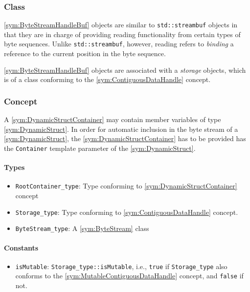 \subsubsection[Class ByteStreamHandleBuf]{Class }

\ref{sym:ByteStreamHandleBuf} objects are similar to \texttt{std::streambuf} objects in that they are in charge of providing reading functionality from certain types of byte sequences. Unlike \texttt{std::streambuf}, however, reading refers to \emph{binding} a reference to the current position in the byte sequence.

\ref{sym:ByteStreamHandleBuf} objects are associated with a \emph{storage} objects, which is of a class conforming to the \ref{sym:ContiguousDataHandle} concept.


\subsubsection[Concept DynamicStructContainer]{Concept }

A \ref{sym:DynamicStructContainer} may contain member variables of type \ref{sym:DynamicStruct}. In order for automatic inclusion in the byte stream of a \ref{sym:DynamicStruct}, the \ref{sym:DynamicStructContainer} has to be provided has the \texttt{Container} template parameter of the \ref{sym:DynamicStruct}.

\paragraph{Types}

\begin{itemize}
	\item \texttt{RootContainer\_type}: Type conforming to \ref{sym:DynamicStructContainer} concept
	\item \texttt{Storage\_type}: Type conforming to \ref{sym:ContiguousDataHandle} concept.
	\item \texttt{ByteStream\_type}: A \ref{sym:ByteStream} class
\end{itemize}

\paragraph{Constants}

\begin{itemize}
	\item \texttt{isMutable}: \texttt{Storage\_type::isMutable}, i.e., \texttt{true} if \texttt{Storage\_type} also conforms to the \ref{sym:MutableContiguousDataHandle} concept, and \texttt{false} if not.
\end{itemize}

